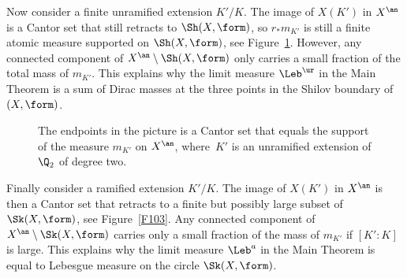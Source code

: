 Now consider a finite unramified extension $K'/K$. The image of $X(K')$ in $X^{\an}$ is a Cantor set that still retracts to $\Sh(X,\form)$, so $r_*m_{K'}$ is still a finite atomic measure supported on $\Sh(X,\form)$, see Figure~\ref{F102}.
However, any connected component of $X^{\an}\setminus\Sh(X,\form)$ only carries a small fraction of the total mass of $m_{K'}$.
This explains why the limit measure $\Leb^{\ur}$ in the Main Theorem is a sum of Dirac masses at the three points in the Shilov boundary of $(X,\form)$.
\begin{figure}[ht]
\centering
{}
\caption{\smaller The endpoints in the picture is a Cantor set that equals the support of the measure $m_{K'}$ on $X^{\an}$, where~$K'$ is an unramified extension of $\Q_2$ of degree two.}\label{F102}
\end{figure}

Finally consider a ramified extension $K'/K$.
The image of $X(K')$ in $X^{\an}$ is then a Cantor set that retracts to a finite but possibly large subset of $\Sk(X,\form)$, see Figure~\ref{F103}. Any connected component of $X^{\an}\setminus\Sk(X,\form)$ carries only a small fraction of the mass of $m_{K'}$ if $[K':K]$ is large.
This explains why the limit measure $\Leb^a$ in the Main Theorem is equal to Lebesgue measure on the circle $\Sk(X,\form)$.

